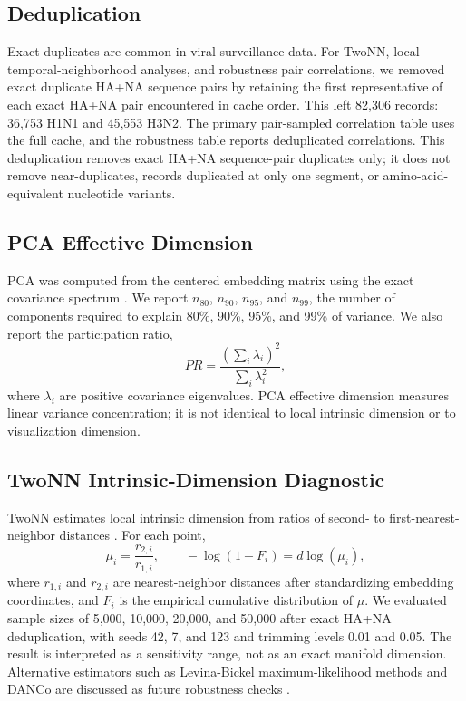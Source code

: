 \documentclass[11pt]{article}
\begin{document}
\subsection{Deduplication}

Exact duplicates are common in viral surveillance data. For TwoNN, local temporal-neighborhood analyses, and robustness pair correlations, we removed exact duplicate HA+NA sequence pairs by retaining the first representative of each exact HA+NA pair encountered in cache order. This left 82,306 records: 36,753 H1N1 and 45,553 H3N2. The primary pair-sampled correlation table uses the full cache, and the robustness table reports deduplicated correlations. This deduplication removes exact HA+NA sequence-pair duplicates only; it does not remove near-duplicates, records duplicated at only one segment, or amino-acid-equivalent nucleotide variants.

\subsection{PCA Effective Dimension}

PCA was computed from the centered embedding matrix using the exact covariance spectrum \cite{jolliffe2002pca,jolliffe2016pca}. We report $n_{80}$, $n_{90}$, $n_{95}$, and $n_{99}$, the number of components required to explain 80\%, 90\%, 95\%, and 99\% of variance. We also report the participation ratio,
\[
PR=\frac{(\sum_i\lambda_i)^2}{\sum_i\lambda_i^2},
\]
where $\lambda_i$ are positive covariance eigenvalues. PCA effective dimension measures linear variance concentration; it is not identical to local intrinsic dimension or to visualization dimension.

\subsection{TwoNN Intrinsic-Dimension Diagnostic}

TwoNN estimates local intrinsic dimension from ratios of second- to first-nearest-neighbor distances \cite{facco2017intrinsic}. For each point,
\[
\mu_i=\frac{r_{2,i}}{r_{1,i}},
\qquad
-\log(1-F_i)=d\log(\mu_i),
\]
where $r_{1,i}$ and $r_{2,i}$ are nearest-neighbor distances after standardizing embedding coordinates, and $F_i$ is the empirical cumulative distribution of $\mu$. We evaluated sample sizes of 5,000, 10,000, 20,000, and 50,000 after exact HA+NA deduplication, with seeds 42, 7, and 123 and trimming levels 0.01 and 0.05. The result is interpreted as a sensitivity range, not as an exact manifold dimension. Alternative estimators such as Levina-Bickel maximum-likelihood methods and DANCo are discussed as future robustness checks \cite{levina2005maximum,ceruti2014danco}.
\end{document}
